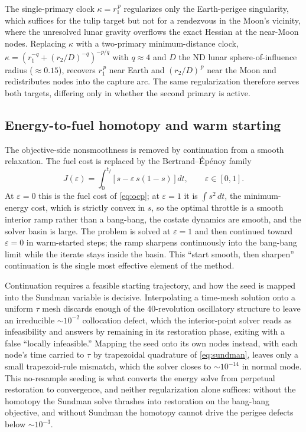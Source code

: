 \documentclass[11pt]{article}
\begin{document}
The single-primary clock $\kappa=r_1^{\,p}$ regularizes only the Earth-perigee
singularity, which suffices for the tulip target but not for a rendezvous in the
Moon's vicinity, where the unresolved lunar gravity overflows the exact Hessian
at the near-Moon nodes. Replacing $\kappa$ with a two-primary minimum-distance
clock, $\kappa=(r_1^{-q}+(r_2/D)^{-q})^{-p/q}$ with $q\approx4$ and $D$ the ND
lunar sphere-of-influence radius ($\approx0.15$), recovers $r_1^{\,p}$ near Earth
and $(r_2/D)^{\,p}$ near the Moon and redistributes nodes into the capture arc.
The same regularization therefore serves both targets, differing only in whether
the second primary is active.

\subsection{Energy-to-fuel homotopy and warm starting}
The objective-side nonsmoothness is removed by continuation from a smooth
relaxation. The fuel cost is replaced by the Bertrand--\'Ep\'enoy family
\begin{equation}
J(\varepsilon)=\int_0^{t_f}\!\big[\,s-\varepsilon\,s(1-s)\,\big]\,dt,
\qquad\varepsilon\in[0,1].
\label{eq:homotopy}
\end{equation}
At $\varepsilon=0$ this is the fuel cost of \cref{eq:ocp}; at $\varepsilon=1$ it
is $\int s^2\,dt$, the minimum-energy cost, which is strictly convex in $s$, so
the optimal throttle is a smooth interior ramp rather than a bang-bang, the
costate dynamics are smooth, and the solver basin is large. The problem is solved
at $\varepsilon=1$ and then continued toward $\varepsilon=0$ in warm-started
steps; the ramp sharpens continuously into the bang-bang limit while the iterate
stays inside the basin. This ``start smooth, then sharpen'' continuation is the
single most effective element of the method.

Continuation requires a feasible starting trajectory, and how the seed is mapped
into the Sundman variable is decisive. Interpolating a time-mesh solution onto a
uniform $\tau$ mesh discards enough of the 40-revolution oscillatory structure to
leave an irreducible $\sim\!10^{-2}$ collocation defect, which the interior-point
solver reads as infeasibility and answers by remaining in its restoration phase,
exiting with a false ``locally infeasible.'' Mapping the seed onto its own nodes
instead, with each node's time carried to $\tau$ by trapezoidal quadrature of
\cref{eq:sundman}, leaves only a small trapezoid-rule mismatch, which the solver
closes to $\sim\!10^{-14}$ in normal mode. This no-resample seeding is what
converts the energy solve from perpetual restoration to convergence, and neither
regularization alone suffices: without the homotopy the Sundman solve thrashes
into restoration on the bang-bang objective, and without Sundman the homotopy
cannot drive the perigee defects below $\sim\!10^{-3}$.
\end{document}
